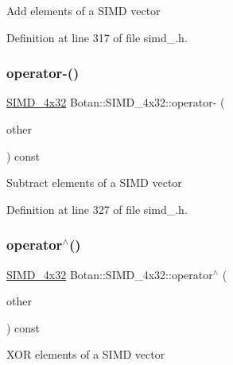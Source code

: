 Add elements of a S\+I\+MD vector 

Definition at line 317 of file simd\+\_.\+h.

\mbox{\label{class_botan_1_1_s_i_m_d__4x32_abc4f7e655f5a1a055143578ee1c53c1c}} 
\subsubsection{\texorpdfstring{operator-\/()}{operator-()}}
{\footnotesize\ttfamily \mbox{\hyperlink{class_botan_1_1_s_i_m_d__4x32}{S\+I\+M\+D\+\_\+4x32}} Botan\+::\+S\+I\+M\+D\+\_\+4x32\+::operator-\/ (\begin{DoxyParamCaption}\item[{const \mbox{\hyperlink{class_botan_1_1_s_i_m_d__4x32}{S\+I\+M\+D\+\_\+4x32}} \&}]{other }\end{DoxyParamCaption}) const\hspace{0.3cm}{\ttfamily [inline]}}

Subtract elements of a S\+I\+MD vector 

Definition at line 327 of file simd\+\_.\+h.

\mbox{\label{class_botan_1_1_s_i_m_d__4x32_addfcb426abcbf5f7f3ed988942eae550}} 
\subsubsection{\texorpdfstring{operator$^\wedge$()}{operator^()}}
{\footnotesize\ttfamily \mbox{\hyperlink{class_botan_1_1_s_i_m_d__4x32}{S\+I\+M\+D\+\_\+4x32}} Botan\+::\+S\+I\+M\+D\+\_\+4x32\+::operator$^\wedge$ (\begin{DoxyParamCaption}\item[{const \mbox{\hyperlink{class_botan_1_1_s_i_m_d__4x32}{S\+I\+M\+D\+\_\+4x32}} \&}]{other }\end{DoxyParamCaption}) const\hspace{0.3cm}{\ttfamily [inline]}}

X\+OR elements of a S\+I\+MD vector 

